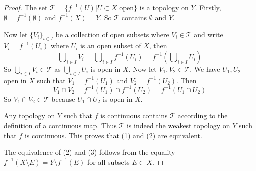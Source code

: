 \documentclass[10pt,a4paper]{amsart}
\theoremstyle{plain}
\theoremstyle{definition}
\theoremstyle{remark}
\numberwithin{equation}{subsection}
\begin{document}
\begin{proof}
The set $\mathcal{T} = \{f^{-1}(U) | U \subset X \text{ open}\}$ is a
topology on $Y$. Firstly, $\emptyset = f^{-1}(\emptyset)$ and $f^{-1}(X) = Y$.
So $\mathcal{T}$ contains $\emptyset$ and $Y$.

\medskip\noindent
Now let $\{V_i\}_{i \in I}$ be a collection of open subsets where
$V_i \in \mathcal{T}$ and write $V_i = f^{-1}(U_i)$ where $U_i$
is an open subset of $X$, then
$$
\bigcup\nolimits_{i\in I} V_i =
\bigcup\nolimits_{i\in I} f^{-1}(U_i) =
f^{-1}\left(\bigcup\nolimits_{i\in I} U_i\right)
$$
So $\bigcup_{i\in I} V_i \in \mathcal{T}$ as $\bigcup_{i\in I} U_i$
is open in $X$.
Now let $V_1, V_2 \in \mathcal{T}$. We have $U_1, U_2$ open in $X$
such that $V_1 = f^{-1}(U_1)$ and $V_2 = f^{-1}(U_2)$. Then
$$
V_1 \cap V_2 = f^{-1}(U_1) \cap f^{-1}(U_2) = f^{-1}(U_1 \cap U_2)
$$
So $V_1 \cap V_2 \in \mathcal{T}$ because $U_1 \cap U_2$ is open in $X$.

\medskip\noindent
Any topology on $Y$ such that $f$ is continuous contains
$\mathcal{T}$ according to the definition of a continuous map.
Thus $\mathcal{T}$ is indeed
the weakest topology on $Y$ such that $f$ is continuous.
This proves that (1) and (2) are equivalent.

\medskip\noindent
The equivalence of (2) and (3) follows from the equality
$f^{-1}(X \setminus E) = Y \setminus f^{-1}(E)$ for all subsets
$E \subset X$.
\end{proof}
\end{document}
